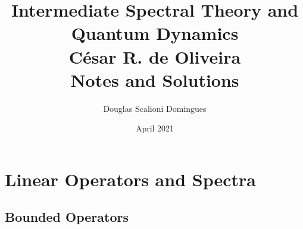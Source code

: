 \documentclass{article}
\theoremstyle{exercisestyle}
\begin{document}
\title{Intermediate Spectral Theory and Quantum Dynamics \\ César R. de Oliveira \\ Notes and Solutions}
\author{Douglas Scalioni Domingues}
\date{April 2021}

\maketitle

\section{Linear Operators and Spectra}

\subsection{Bounded Operators}
\end{document}
